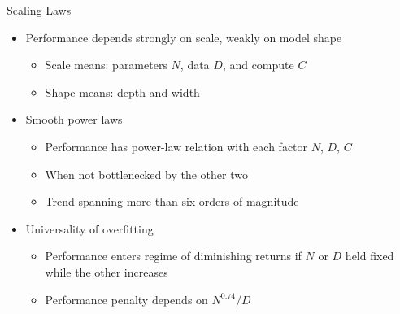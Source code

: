 \begin{vbframe}{Scaling Laws}
\href{https://arxiv.org/abs/2001.08361}{} 

\vfill

\begin{itemize}

	\item Performance depends strongly on scale, weakly on model shape
	\begin{itemize}
	\item Scale means: parameters $N$, data $D$, and compute $C$
	\item Shape means: depth and width
	\end{itemize}

	\item Smooth power laws
	\begin{itemize}
	\item Performance has power-law relation with each factor $N$, $D$, $C$
	\item When not bottlenecked by the other two 
	\item Trend spanning more than six orders of magnitude
	\end{itemize}

	\item Universality of overfitting 
	\begin{itemize}
	\item Performance enters regime of diminishing returns if $N$ or $D$ held fixed while the other increases
	\item Performance penalty depends on $N^{0.74} / D$
	\end{itemize}

\end{itemize}

\vfill

\end{vbframe}


